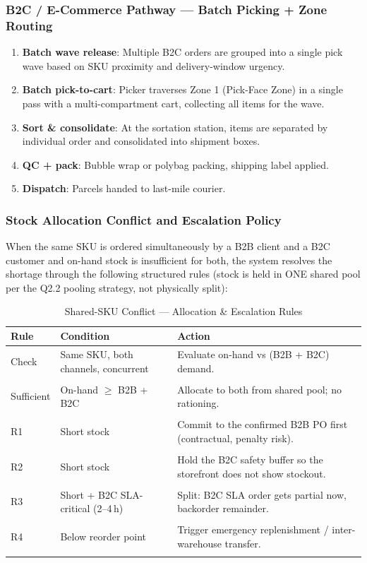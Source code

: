 \documentclass[11pt]{article}
\begin{document}
\subsubsection{B2C / E-Commerce Pathway — Batch Picking + Zone Routing}\label{b2c-path}
\begin{enumerate}
    \item \textbf{Batch wave release}: Multiple B2C orders are grouped into a single
          pick wave based on SKU proximity and delivery-window urgency.
    \item \textbf{Batch pick-to-cart}: Picker traverses Zone 1 (Pick-Face Zone) in a
          single pass with a multi-compartment cart, collecting all items for the wave.
    \item \textbf{Sort \& consolidate}: At the sortation station, items are separated
          by individual order and consolidated into shipment boxes.
    \item \textbf{QC + pack}: Bubble wrap or polybag packing, shipping label applied.
    \item \textbf{Dispatch}: Parcels handed to last-mile courier.
\end{enumerate}

\subsubsection{Stock Allocation Conflict and Escalation Policy}\label{conflict}

When the same SKU is ordered simultaneously by a B2B client and a B2C customer
and on-hand stock is insufficient for both, the system resolves the shortage through
the following structured rules (stock is held in ONE shared pool per the Q2.2 pooling strategy, not physically split):

\begin{table}[H]
\centering
\caption{Shared-SKU Conflict --- Allocation \& Escalation Rules}
\begin{tabular}{lp{4cm}p{6.5cm}}
\toprule
Rule & Condition & Action \\
\midrule
        Check & Same SKU, both channels, concurrent & Evaluate on-hand vs (B2B + B2C) demand. \\\\
        Sufficient & On-hand $\geq$ B2B + B2C & Allocate to both from shared pool; no rationing. \\\\
        R1 & Short stock & Commit to the confirmed B2B PO first (contractual, penalty risk). \\\\
        R2 & Short stock & Hold the B2C safety buffer so the storefront does not show stockout. \\\\
        R3 & Short + B2C SLA-critical (2--4\,h) & Split: B2C SLA order gets partial now, backorder remainder. \\\\
        R4 & Below reorder point & Trigger emergency replenishment / inter-warehouse transfer. \\\\
\bottomrule
\end{tabular}
\end{table}
\end{document}
